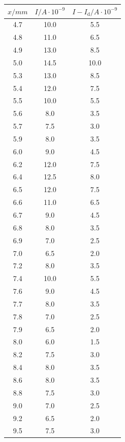 \begin{table}
\begin{minipage}{0.46\textwidth}
\end{minipage}
\begin{minipage}{0.46\textwidth}
    \centering
	\begin{tabular}{c|c|c}
		\toprule
		{$x / mm$} & {$I / A\cdot10^{-9}$}& {$I - I_\text{d} / A\cdot10^{-9}$} \\
		\hline
        \midrule
        4.7 &10.0&5.5\\
        4.8 &11.0&6.5\\
        4.9 &13.0&8.5\\
        5.0 &14.5&10.0\\
        5.3 &13.0&8.5\\
        5.4 &12.0&7.5\\
        5.5 &10.0&5.5\\
        5.6 &8.0&3.5\\
        5.7 &7.5&3.0\\
        5.9 &8.0&3.5\\
        6.0 &9.0&4.5\\
        6.2 &12.0&7.5\\
        6.4 &12.5&8.0\\
        6.5 &12.0&7.5\\
        6.6 &11.0&6.5\\
        6.7 &9.0&4.5\\
        6.8 &8.0&3.5\\
        6.9 &7.0&2.5\\
        7.0 &6.5&2.0\\
        7.2 &8.0&3.5\\
        7.4 &10.0&5.5\\
        7.6 &9.0&4.5\\
        7.7 &8.0&3.5\\
        7.8 &7.0&2.5\\
        7.9 &6.5&2.0\\
        8.0 &6.0&1.5\\
        8.2 &7.5&3.0\\
        8.4 &8.0&3.5\\
        8.6 &8.0&3.5\\
        8.8 &7.5&3.0\\
        9.0 &7.0&2.5\\
        9.2 &6.5&2.0\\
        9.5 &7.5&3.0\\
		\bottomrule 
	\end{tabular}
\end{minipage}
\end{table}
